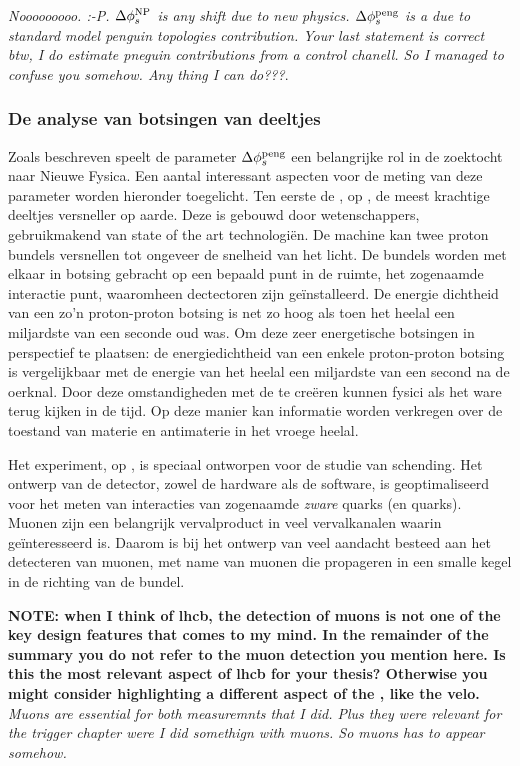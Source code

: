 {\color{green}\it Nooooooooo. :-P. $\Delta\phi_{s}^{\tiny \text{NP}}$ is any shift due to new physics.
$\Delta\phi_{s}^{\tiny\text{peng}}$ is a due to standard model penguin topologies contribution. Your last statement
is correct btw, I do estimate pneguin contributions from a control chanell. So I managed to confuse
you somehow. Any thing I can do???}.\\

\subsubsection{De analyse van botsingen van deeltjes}
Zoals beschreven speelt de parameter $\Delta\phi_{s}^{\tiny\text{peng}}$ een belangrijke rol in de zoektocht naar Nieuwe Fysica. Een aantal interessant aspecten voor de meting van deze parameter worden hieronder toegelicht. Ten eerste de \lhc, op \cern, de meest krachtige deeltjes versneller op aarde. Deze is gebouwd door wetenschappers, gebruikmakend van state of the art technologi\"en. De machine kan twee proton bundels versnellen tot ongeveer de snelheid van het licht. De bundels worden met elkaar in botsing gebracht op een bepaald punt in de ruimte, het zogenaamde interactie punt, waaromheen dectectoren zijn ge\"installeerd. De energie dichtheid van een zo'n proton-proton botsing is net zo hoog als toen het heelal een miljardste van een seconde oud was. Om deze zeer energetische botsingen in perspectief te plaatsen: de energiedichtheid van een enkele proton-proton botsing is vergelijkbaar met de energie van het heelal een miljardste van een second na de oerknal. Door deze omstandigheden met de \lhc te cre\"eren kunnen fysici als het ware terug kijken  in de tijd. Op deze manier kan informatie worden verkregen over de toestand van materie en antimaterie in het vroege heelal.

Het \lhcb experiment, op \cern, is speciaal ontworpen voor de studie van \CP schending. Het ontwerp van de detector, zowel de hardware als de software, is geoptimaliseerd voor het meten van interacties van zogenaamde {\it zware} quarks (\bquark en \cquark quarks). Muonen zijn een belangrijk vervalproduct in veel vervalkanalen waarin \lhcb ge\"interesseerd is.  Daarom is bij het ontwerp van \lhcb veel aandacht besteed aan het detecteren van muonen, met name van muonen die propageren in een smalle kegel in de richting van de bundel.

\textbf{NOTE: when I think of lhcb, the detection of muons is not one of the key design features that comes to my mind.
In the remainder of the summary you do not refer to the muon detection you mention here.
Is this the most relevant aspect of lhcb for your thesis? Otherwise you might consider highlighting
a different aspect of the \lhcb, like the velo. }\\
{\color{green}\it Muons are essential for both measuremnts that I did. Plus they were relevant for the trigger chapter
were I did somethign with muons. So muons has to appear somehow. }\\


